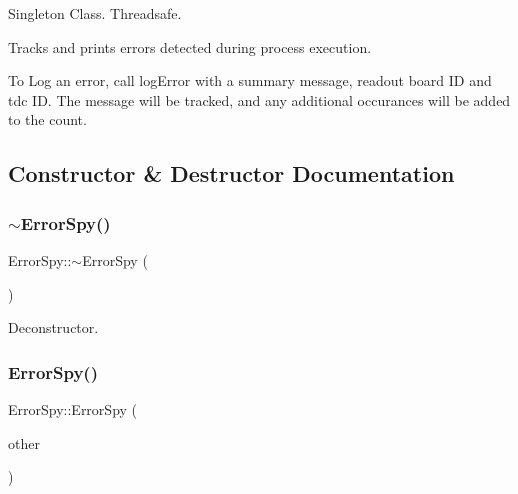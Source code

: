 Singleton Class. Threadsafe.

Tracks and prints errors detected during process execution.

To Log an error, call log\+Error with a summary message, readout board ID and tdc ID. The message will be tracked, and any additional occurances will be added to the count. 

\subsection{Constructor \& Destructor Documentation}
\mbox{\label{class_error_spy_aa9afe918ddadd03debbbbae613c89e74}} 
\subsubsection{\texorpdfstring{$\sim$\+Error\+Spy()}{~ErrorSpy()}}
{\footnotesize\ttfamily Error\+Spy\+::$\sim$\+Error\+Spy (\begin{DoxyParamCaption}{ }\end{DoxyParamCaption})}



Deconstructor. 

\mbox{\label{class_error_spy_aa10c8604df16528fa51fc00e9b84e184}} 
\subsubsection{\texorpdfstring{Error\+Spy()}{ErrorSpy()}\hspace{0.1cm}{\footnotesize\ttfamily [1/3]}}
{\footnotesize\ttfamily Error\+Spy\+::\+Error\+Spy (\begin{DoxyParamCaption}\item[{const \hyperlink{class_error_spy}{Error\+Spy} \&}]{other }\end{DoxyParamCaption})\hspace{0.3cm}{\ttfamily [delete]}}

\mbox{\label{class_error_spy_a07d843cb06eb0a6bfd47734b6c31e289}} 
